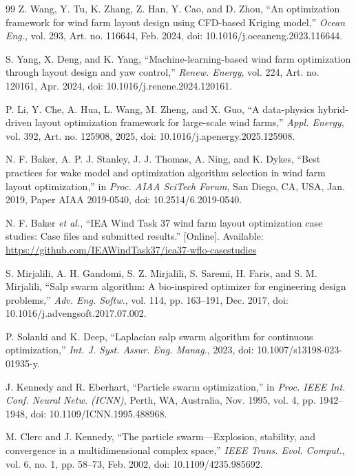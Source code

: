 \documentclass[journal,twoside]{IEEEtran}
\begin{document}
\begin{thebibliography}{99}
Z. Wang, Y. Tu, K. Zhang, Z. Han, Y. Cao, and D. Zhou, ``An optimization framework for wind farm layout design using CFD-based Kriging model,'' \textit{Ocean Eng.}, vol. 293, Art. no. 116644, Feb. 2024, doi: 10.1016/j.oceaneng.2023.116644.

S. Yang, X. Deng, and K. Yang, ``Machine-learning-based wind farm optimization through layout design and yaw control,'' \textit{Renew. Energy}, vol. 224, Art. no. 120161, Apr. 2024, doi: 10.1016/j.renene.2024.120161.

P. Li, Y. Che, A. Hua, L. Wang, M. Zheng, and X. Guo, ``A data-physics hybrid-driven layout optimization framework for large-scale wind farms,'' \textit{Appl. Energy}, vol. 392, Art. no. 125908, 2025, doi: 10.1016/j.apenergy.2025.125908.

N. F. Baker, A. P. J. Stanley, J. J. Thomas, A. Ning, and K. Dykes, ``Best practices for wake model and optimization algorithm selection in wind farm layout optimization,'' in \textit{Proc. AIAA SciTech Forum}, San Diego, CA, USA, Jan. 2019, Paper AIAA 2019-0540, doi: 10.2514/6.2019-0540.

N. F. Baker \textit{et al.}, ``IEA Wind Task 37 wind farm layout optimization case studies: Case files and submitted results.'' [Online]. Available: \url{https://github.com/IEAWindTask37/iea37-wflo-casestudies}

S. Mirjalili, A. H. Gandomi, S. Z. Mirjalili, S. Saremi, H. Faris, and S. M. Mirjalili, ``Salp swarm algorithm: A bio-inspired optimizer for engineering design problems,'' \textit{Adv. Eng. Softw.}, vol. 114, pp. 163--191, Dec. 2017, doi: 10.1016/j.advengsoft.2017.07.002.

P. Solanki and K. Deep, ``Laplacian salp swarm algorithm for continuous optimization,'' \textit{Int. J. Syst. Assur. Eng. Manag.}, 2023, doi: 10.1007/s13198-023-01935-y.

J. Kennedy and R. Eberhart, ``Particle swarm optimization,'' in \textit{Proc. IEEE Int. Conf. Neural Netw. (ICNN)}, Perth, WA, Australia, Nov. 1995, vol. 4, pp. 1942--1948, doi: 10.1109/ICNN.1995.488968.

M. Clerc and J. Kennedy, ``The particle swarm---Explosion, stability, and convergence in a multidimensional complex space,'' \textit{IEEE Trans. Evol. Comput.}, vol. 6, no. 1, pp. 58--73, Feb. 2002, doi: 10.1109/4235.985692.


\end{thebibliography}
\end{document}
